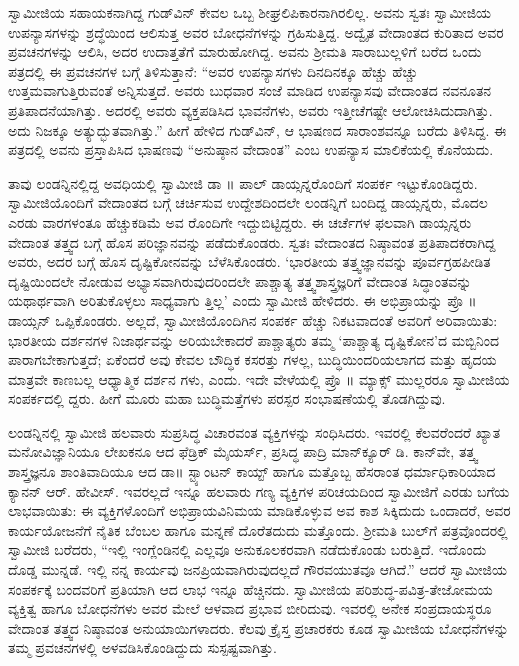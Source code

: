 ಸ್ವಾಮೀಜಿಯ ಸಹಾಯಕನಾಗಿದ್ದ ಗುಡ್​ವಿನ್ ಕೇವಲ ಒಬ್ಬ ಶೀಘ್ರಲಿಪಿಕಾರನಾಗಿರಲಿಲ್ಲ. ಅವನು ಸ್ವತಃ ಸ್ವಾಮೀಜಿಯ ಉಪನ್ಯಾಸಗಳನ್ನು ಶ್ರದ್ಧೆಯಿಂದ ಆಲಿಸುತ್ತ ಅವರ ಬೋಧನೆಗಳನ್ನು ಗ್ರಹಿಸುತ್ತಿದ್ದ. ಅದ್ವೈತ ವೇದಾಂತದ ಕುರಿತಾದ ಅವರ ಪ್ರವಚನಗಳನ್ನು ಆಲಿಸಿ, ಅದರ ಉದಾತ್ತತೆಗೆ ಮಾರುಹೋಗಿದ್ದ. ಅವನು ಶ್ರೀಮತಿ ಸಾರಾಬುಲ್ಲಳಿಗೆ ಬರೆದ ಒಂದು ಪತ್ರದಲ್ಲಿ ಈ ಪ್ರವಚನಗಳ ಬಗ್ಗೆ ತಿಳಿಸುತ್ತಾನೆ: “ಅವರ ಉಪನ್ಯಾಸಗಳು ದಿನದಿನಕ್ಕೂ ಹೆಚ್ಚು ಹೆಚ್ಚು ಉತ್ತಮವಾಗುತ್ತಿರುವಂತೆ ಅನ್ನಿಸುತ್ತದೆ. ಅವರು ಬುಧವಾರ ಸಂಜೆ ಮಾಡಿದ ಉಪನ್ಯಾಸವು ವೇದಾಂತದ ನವನೂತನ ಪ್ರತಿಪಾದನೆಯಾಗಿತ್ತು. ಅದರಲ್ಲಿ ಅವರು ವ್ಯಕ್ತಪಡಿಸಿದ ಭಾವನೆಗಳು, ಅವರು ಇತ್ತೀಚೆಗಷ್ಟೇ ಆಲೋಚಿಸಿದುದಾಗಿತ್ತು. ಅದು ನಿಜಕ್ಕೂ ಅತ್ಯುದ್ಭುತವಾಗಿತ್ತು.” ಹೀಗೆ ಹೇಳಿದ ಗುಡ್​ವಿನ್, ಆ ಭಾಷಣದ ಸಾರಾಂಶವನ್ನೂ ಬರೆದು ತಿಳಿಸಿದ್ದ. ಈ ಪತ್ರದಲ್ಲಿ ಅವನು ಪ್ರಸ್ತಾಪಿಸಿದ ಭಾಷಣವು “ಅನುಷ್ಠಾನ ವೇದಾಂತ” ಎಂಬ ಉಪನ್ಯಾಸ ಮಾಲಿಕೆಯಲ್ಲಿ ಕೊನೆಯದು.

ತಾವು ಲಂಡನ್ನಿನಲ್ಲಿದ್ದ ಅವಧಿಯಲ್ಲಿ ಸ್ವಾಮೀಜಿ ಡಾ ॥ ಪಾಲ್ ಡಾಯ್ಸನ್ನರೊಂದಿಗೆ ಸಂಪರ್ಕ ಇಟ್ಟುಕೊಂಡಿದ್ದರು. ಸ್ವಾಮೀಜಿಯೊಂದಿಗೆ ವೇದಾಂತದ ಬಗ್ಗೆ ಚರ್ಚಿಸುವ ಉದ್ದೇಶದಿಂದಲೇ ಲಂಡನ್ನಿಗೆ ಬಂದಿದ್ದ ಡಾಯ್ಸನ್ನರು, ಮೊದಲ ಎರಡು ವಾರಗಳಂತೂ ಹೆಚ್ಚುಕಡಿಮೆ ಅವ ರೊಂದಿಗೇ ಇದ್ದುಬಿಟ್ಟಿದ್ದರು. ಈ ಚರ್ಚೆಗಳ ಫಲವಾಗಿ ಡಾಯ್ಸನ್ನರು ವೇದಾಂತ ತತ್ತ್ವದ ಬಗ್ಗೆ ಹೊಸ ಪರಿಜ್ಞಾನವನ್ನು ಪಡೆದುಕೊಂಡರು. ಸ್ವತಃ ವೇದಾಂತದ ನಿಷ್ಠಾವಂತ ಪ್ರತಿಪಾದಕರಾಗಿದ್ದ ಅವರು, ಅದರ ಬಗ್ಗೆ ಹೊಸ ದೃಷ್ಟಿಕೋನವನ್ನು ಬೆಳೆಸಿಕೊಂಡರು. ‘ಭಾರತೀಯ ತತ್ತ್ವಜ್ಞಾನವನ್ನು ಪೂರ್ವಗ್ರಹಪೀಡಿತ ದೃಷ್ಟಿಯಿಂದಲೇ ನೋಡುವ ಅಭ್ಯಾಸವಾಗಿರುವುದರಿಂದಲೇ ಪಾಶ್ಚಾತ್ಯ ತತ್ತ್ವಶಾಸ್ತ್ರಜ್ಞರಿಗೆ ವೇದಾಂತ ಸಿದ್ಧಾಂತವನ್ನು ಯಥಾರ್ಥವಾಗಿ ಅರಿತುಕೊಳ್ಳಲು ಸಾಧ್ಯವಾಗು ತ್ತಿಲ್ಲ’ ಎಂದು ಸ್ವಾಮೀಜಿ ಹೇಳಿದರು. ಈ ಅಭಿಪ್ರಾಯನ್ನು ಪ್ರೊ ॥ ಡಾಯ್ಸನ್ ಒಪ್ಪಿಕೊಂಡರು. ಅಲ್ಲದೆ, ಸ್ವಾಮೀಜಿಯೊಂದಿಗಿನ ಸಂಪರ್ಕ ಹೆಚ್ಚು ನಿಕಟವಾದಂತೆ ಅವರಿಗೆ ಅರಿವಾಯಿತು: ಭಾರತೀಯ ದರ್ಶನಗಳ ನಿಜಾರ್ಥವನ್ನು ಅರಿಯಬೇಕಾದರೆ ಪಾಶ್ಚಾತ್ಯರು ತಮ್ಮ ‘ಪಾಶ್ಚಾತ್ಯ ದೃಷ್ಟಿಕೋನ’ದ ಮಬ್ಬಿನಿಂದ ಪಾರಾಗಬೇಕಾಗುತ್ತದೆ; ಏಕೆಂದರೆ ಅವು ಕೇವಲ ಬೌದ್ಧಿಕ ಕಸರತ್ತು ಗಳಲ್ಲ, ಬುದ್ಧಿಯಿಂದರಿಯಲಾಗದ ಮತ್ತು ಹೃದಯ ಮಾತ್ರವೇ ಕಾಣಬಲ್ಲ ಆಧ್ಯಾತ್ಮಿಕ ದರ್ಶನ ಗಳು, ಎಂದು. ಇದೇ ವೇಳೆಯಲ್ಲಿ ಪ್ರೊ ॥ ಮ್ಯಾಕ್ಸ್ ಮುಲ್ಲರರೂ ಸ್ವಾಮೀಜಿಯ ಸಂಪರ್ಕದಲ್ಲಿ ದ್ದರು. ಹೀಗೆ ಮೂರು ಮಹಾ ಬುದ್ಧಿಮತ್ತೆಗಳು ಪರಸ್ಪರ ಸಂಭಾಷಣೆಯಲ್ಲಿ ತೊಡಗಿದ್ದುವು.

ಲಂಡನ್ನಿನಲ್ಲಿ ಸ್ವಾಮೀಜಿ ಹಲವಾರು ಸುಪ್ರಸಿದ್ಧ ವಿಚಾರವಂತ ವ್ಯಕ್ತಿಗಳನ್ನು ಸಂಧಿಸಿದರು. ಇವರಲ್ಲಿ ಕೆಲವರೆಂದರೆ ಖ್ಯಾತ ಮನೋವಿಜ್ಞಾನಿಯೂ ಲೇಖಕನೂ ಆದ ಫೆಡ್ರಿಕ್ ಮೈಯರ್ಸ್, ಪ್ರಸಿದ್ಧ ಪಾದ್ರಿ ಮಾನ್​ಕ್ಯೂರ್ ಡಿ. ಕಾನ್​ವೇ, ತತ್ತ್ವ ಶಾಸ್ತ್ರಜ್ಞನೂ ಶಾಂತಿವಾದಿಯೂ ಆದ ಡಾ॥ ಸ್ಟ್ಯಾಂಟನ್ ಕಾಯ್ಟ್ ಹಾಗೂ ಮತ್ತೊಬ್ಬ ಹೆಸರಾಂತ ಧರ್ಮಾಧಿಕಾರಿಯಾದ ಕ್ಯಾನನ್ ಆರ್. ಹೇವೀಸ್. ಇವರಲ್ಲದೆ ಇನ್ನೂ ಹಲವಾರು ಗಣ್ಯ ವ್ಯಕ್ತಿಗಳ ಪರಿಚಯದಿಂದ ಸ್ವಾಮೀಜಿಗೆ ಎರಡು ಬಗೆಯ ಲಾಭವಾಯಿತು: ಈ ವ್ಯಕ್ತಿಗಳೊಂದಿಗೆ ಅಭಿಪ್ರಾಯವಿನಿಮಯ ಮಾಡಿಕೊಳ್ಳುವ ಅವ ಕಾಶ ಸಿಕ್ಕಿದುದು ಒಂದಾದರೆ, ಅವರ ಕಾರ್ಯಯೋಜನೆಗೆ ನೈತಿಕ ಬೆಂಬಲ ಹಾಗೂ ಮನ್ನಣೆ ದೊರೆತದುದು ಮತ್ತೊಂದು. ಶ್ರೀಮತಿ ಬುಲ್​ಗೆ ಪತ್ರವೊಂದರಲ್ಲಿ ಸ್ವಾಮೀಜಿ ಬರೆದರು, “ಇಲ್ಲಿ ಇಂಗ್ಲೆಂಡಿನಲ್ಲಿ ಎಲ್ಲವೂ ಅನುಕೂಲಕರವಾಗಿ ನಡೆದುಕೊಂಡು ಬರುತ್ತಿದೆ. ಇದೊಂದು ದೊಡ್ಡ ಮುನ್ನಡೆ. ಇಲ್ಲಿ ನನ್ನ ಕಾರ್ಯವು ಜನಪ್ರಿಯವಾಗಿರುವುದಲ್ಲದೆ ಗೌರವಯುತವೂ ಆಗಿದೆ.” ಆದರೆ ಸ್ವಾಮೀಜಿಯ ಸಂಪರ್ಕಕ್ಕೆ ಬಂದವರಿಗೆ ಪ್ರತಿಯಾಗಿ ಆದ ಲಾಭ ಇನ್ನೂ ಹೆಚ್ಚಿನದು. ಸ್ವಾಮೀಜಿಯ ಪರಿಶುದ್ಧ-ಪವಿತ್ರ-ತೇಜೋಮಯ ವ್ಯಕ್ತಿತ್ವ ಹಾಗೂ ಬೋಧನೆಗಳು ಅವರ ಮೇಲೆ ಆಳವಾದ ಪ್ರಭಾವ ಬೀರಿದುವು. ಇವರಲ್ಲಿ ಅನೇಕ ಸಂಪ್ರದಾಯಸ್ಥರೂ ವೇದಾಂತ ತತ್ತ್ವದ ನಿಷ್ಠಾವಂತ ಅನುಯಾಯಿಗಳಾದರು. ಕೆಲವು ಕ್ರೈಸ್ತ ಪ್ರಚಾರಕರು ಕೂಡ ಸ್ವಾಮೀಜಿಯ ಬೋಧನೆಗಳನ್ನು ತಮ್ಮ ಪ್ರವಚನಗಳಲ್ಲಿ ಅಳವಡಿಸಿಕೊಂಡಿದ್ದುದು ಸುಸ್ಪಷ್ಟವಾಗಿತ್ತು.

